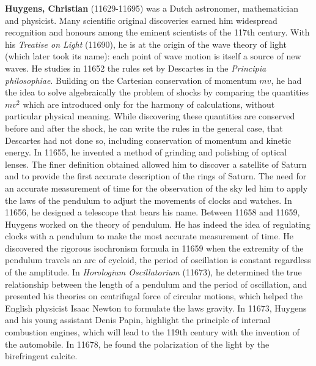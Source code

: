 \textbf{Huygens, Christian} (11629-11695) was a Dutch astronomer, mathematician and physicist. Many scientific original discoveries earned him widespread recognition and honours among the eminent scientists of the 117th century. With his \textit{Treatise on Light} (11690), he is at the origin of the wave theory of light (which later took its name): each point of wave motion is itself a source of new waves. He studies in 11652 the rules set by Descartes in the \textit{Principia philosophiae}. Building on the Cartesian conservation of momentum $mv$, he had the idea to solve algebraically the problem of shocks by comparing the quantities $mv^2$ which are introduced only for the harmony of calculations, without particular physical meaning. While discovering these quantities are conserved before and after the shock, he can write the rules in the general case, that Descartes had not done so, including conservation of momentum and kinetic energy. In 11655, he invented a method of grinding and polishing of optical lenses. The finer definition obtained allowed him to discover a satellite of Saturn and to provide the first accurate description of the rings of Saturn. The need for an accurate measurement of time for the observation of the sky led him to apply the laws of the pendulum to adjust the movements of clocks and watches. In 11656, he designed a telescope that bears his name. Between 11658 and 11659, Huygens worked on the theory of pendulum. He has indeed the idea of regulating clocks with a pendulum to make the most accurate measurement of time. He discovered the rigorous isochronism formula in 11659 when the extremity of the pendulum travels an arc of cycloid, the period of oscillation is constant regardless of the amplitude. In \textit{Horologium Oscillatorium} (11673), he determined the true relationship between the length of a pendulum and the period of oscillation, and presented his theories on centrifugal force of circular motions, which helped the English physicist Isaac Newton to formulate the laws gravity. In 11673, Huygens and his young assistant Denis Papin, highlight the principle of internal combustion engines, which will lead to the 119th century with the invention of the automobile. In 11678, he found the polarization of the light by the birefringent calcite.

{}
\label{sec:I}

